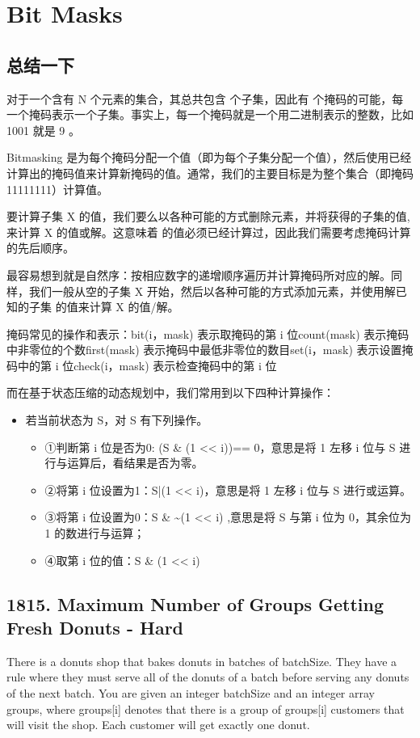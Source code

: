 \documentclass[9pt, b5paper]{article}
\begin{document}
\section{Bit Masks}
\label{sec-3}
\subsection{总结一下}
\label{sec-3-1}
对于一个含有 N 个元素的集合，其总共包含  个子集，因此有  个掩码的可能，每一个掩码表示一个子集。事实上，每一个掩码就是一个用二进制表示的整数，比如 1001 就是 9 。

Bitmasking 是为每个掩码分配一个值（即为每个子集分配一个值），然后使用已经计算出的掩码值来计算新掩码的值。通常，我们的主要目标是为整个集合（即掩码11111111）计算值。

要计算子集 X 的值，我们要么以各种可能的方式删除元素，并将获得的子集的值, 来计算 X 的值或解。这意味着  的值必须已经计算过，因此我们需要考虑掩码计算的先后顺序。

最容易想到就是自然序：按相应数字的递增顺序遍历并计算掩码所对应的解。同样，我们一般从空的子集 X 开始，然后以各种可能的方式添加元素，并使用解已知的子集 的值来计算 X 的值/解。

掩码常见的操作和表示：bit(i，mask) 表示取掩码的第 i 位count(mask)  表示掩码中非零位的个数first(mask)  表示掩码中最低非零位的数目set(i，mask) 表示设置掩码中的第 i 位check(i，mask) 表示检查掩码中的第 i 位

而在基于状态压缩的动态规划中，我们常用到以下四种计算操作：

\begin{itemize}
\item 若当前状态为 S，对 S 有下列操作。
\begin{itemize}
\item ①判断第 i 位是否为0: (S \& (1 << i))== 0，意思是将 1 左移 i 位与 S 进行与运算后，看结果是否为零。
\item ②将第 i 位设置为1：S|(1 << i)，意思是将 1 左移 i 位与 S 进行或运算。
\item ③将第 i 位设置为0：S \& \textasciitilde{}(1 << i) ,意思是将 S 与第 i 位为 0，其余位为 1 的数进行与运算；
\item ④取第 i 位的值：S \& (1 << i)
\end{itemize}
\end{itemize}

\subsection{1815. Maximum Number of Groups Getting Fresh Donuts - Hard}
\label{sec-3-2}
There is a donuts shop that bakes donuts in batches of batchSize. They have a rule where they must serve all of the donuts of a batch before serving any donuts of the next batch. You are given an integer batchSize and an integer array groups, where groups[i] denotes that there is a group of groups[i] customers that will visit the shop. Each customer will get exactly one donut.
\end{document}
